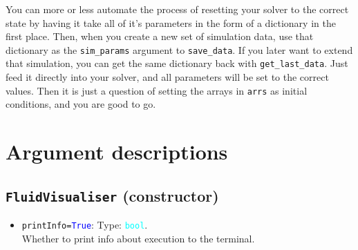 \documentclass{article}
\newcommand{\ttt}[1]{\texttt{#1}}
\newcommand{\ptype}[1]{\texttt{\textcolor{cyan}{#1}}}
\newcommand{\cbl}[1]{\textcolor{blue}{#1}}
\newcommand{\cro}[1]{\textcolor{RedOrange}{#1}}
\begin{document}
You can more or less automate the process of resetting your solver to the correct state by having it take all of it's parameters in the form of a dictionary in the first place. Then, when you create a new set of simulation data, use that dictionary as the \ttt{sim\_params} argument to \ttt{save\_data}. If you later want to extend that simulation, you can get the same dictionary back with \ttt{get\_last\_data}. Just feed it directly into your solver, and all parameters will be set to the correct values. Then it is just a question of setting the arrays in \ttt{arrs} as initial conditions, and you are good to go.

\section{Argument descriptions}
\label{sec:margs}
\subsection{\ttt{FluidVisualiser} (constructor)}
\label{sec:const}
\begin{itemize}
	\item \ttt{\cro{printInfo}=\cbl{True}}: Type: \ptype{bool}.\\Whether to print info about execution to the terminal.
\end{itemize}
\end{document}
